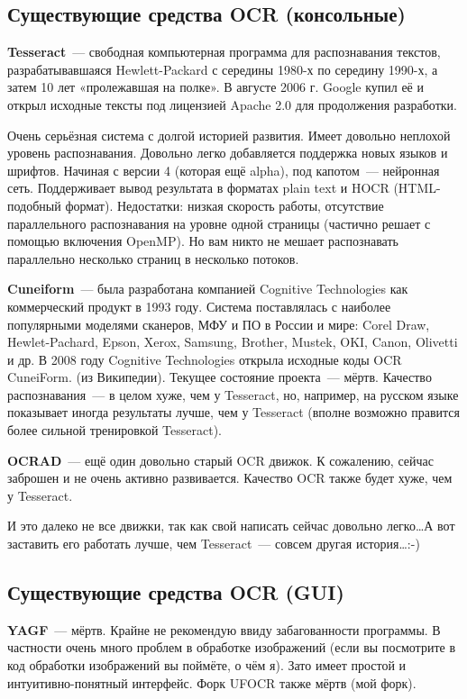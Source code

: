 \documentclass[10pt, a5paper]{article}
\begin{document}
\subsection*{Существующие средства OCR (консольные)}

\textbf{Tesseract}~--- свободная компьютерная программа для распознавания текстов, разрабатывавшаяся Hewlett-Packard с середины 1980-х по середину 1990-х, а затем 10 лет «пролежавшая на полке». В августе 2006 г. Google купил её и открыл исходные тексты под лицензией Apache 2.0 для продолжения разработки.

Очень серьёзная система с долгой историей развития. Имеет довольно неплохой уровень распознавания. Довольно легко добавляется поддержка новых языков и шрифтов. Начиная с версии 4 (которая ещё alpha), под капотом~--- нейронная сеть. Поддерживает вывод результата в форматах plain text и HOCR (HTML-подобный формат). Недостатки: низкая скорость работы, отсутствие параллельного распознавания на уровне одной страницы (частично решает с помощью включения OpenMP). Но вам никто не мешает распознавать параллельно несколько страниц в несколько потоков.

\textbf{Cuneiform}~--- была разработана компанией Cognitive \linebreak Technologies как коммерческий продукт в 1993 году. Система поставлялась с наиболее популярными моделями сканеров, МФУ и ПО в России и мире: Corel Draw, Hewlet-Pachard, Epson, Xerox, Samsung, Brother, Mustek, OKI, Canon, Olivetti и др. В 2008 году Cognitive Technologies открыла исходные коды OCR CuneiForm. (из Википедии). Текущее состояние проекта~--- мёртв. Качество распознавания~--- в целом хуже, чем у Tesseract, но, например, на русском языке показывает иногда результаты лучше, чем у Tesseract (вполне возможно правится более сильной тренировкой Tesseract).

\textbf{OCRAD}~--- ещё один довольно старый OCR движок. К сожалению, сейчас заброшен и не очень активно развивается. Качество OCR также будет хуже, чем у Tesseract.

И это далеко не все движки, так как свой написать сейчас довольно легко\ldots А вот заставить его работать лучше, чем Tesseract~--- совсем другая история\ldots :-)

\subsection*{Существующие средства OCR (GUI)}

\textbf{YAGF}~--- мёртв. Крайне не рекомендую ввиду забагованности программы. В частности очень много проблем в обработке изображений (если вы посмотрите в код обработки изображений вы поймёте, о чём я). Зато имеет простой и интуитивно-понятный интерфейс. Форк UFOCR также мёртв (мой форк).
\end{document}

